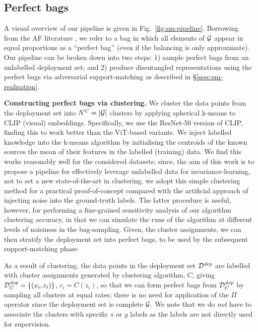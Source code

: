 %
\subsection{Perfect bags}\label{sec:sm-implementation}
%
A visual overview of our pipeline is given in Fig.~\ref{fig:sm-pipeline}. 
%
Borrowing from the \ac{AF} literature \citep{chouldechova17,KleMulRag16}, we refer to a bag in
which all elements of ${\mathcal{G}}$ appear in equal proportions as a ``perfect bag'' (even if the balancing
is only approximate). 
%
Our pipeline can be broken down into two steps: 1) sample perfect bags from an unlabelled
deployment set; and 2) produce disentangled representations using the perfect bags via adversarial
support-matching as described in \S\ref{ssec:sm-realisation}.

\textbf{Constructing perfect bags via clustering.}
%
We cluster the data points from the deployment set into \( N^C=|{\mathcal{G}}| \) clusters by applying
spherical k-means to CLIP \cite{radford2021learning} (visual) embeddings. 
%
Specifically, we use the ResNet-50 version of CLIP, finding this to work better than the ViT-based
variants. 
%
We inject labelled knowledge into the k-means algorithm by initialising the centroids of the known
sources the mean of their features in the labelled (training) data. 
%
We find this works reasonably well for the considered datasets; since, the aim of this work is to
propose a pipeline for effectively leverage unlabelled data for invariance-learning, not to set a
new state-of-the-art in clustering, we adopt this simple clustering method for a practical
proof-of-concept compared with the artificial approach of injecting noise into the ground-truth
labels. 
%
The latter procedure is useful, however, for performing a fine-grained sensitivity analysis of our
algorithm \wrt{} clustering accuracy, in that we can simulate the runs of the algorithm at
different levels of noisiness in the bag-sampling. 
%
%
Given, the cluster assignments, we can then stratify the deployment set into perfect bags, to be
used by the subsequent support-matching phase.

As a result of clustering, the data points in the deployment set \( {\mathcal{D}}^\mathit{dep} \) are
labelled with cluster assignments generated by clustering algorithm, \( C \), giving \(
{\mathcal{D}}^\mathit{dep}_C=\{(x_i, c_i)\} \), \(c_i = C(z_i) \),
%
so that we can form perfect bags from \( {\mathcal{D}}^\mathit{dep}_C \) by sampling all clusters at equal
rates; there is no need for application of the $\Pi$ operator since the deployment set is complete
\wrt{} ${\mathcal{G}}$.
%
We note that we do \emph{not} have to associate the clusters with specific $s$ or $y$ labels as the
labels are not directly used for supervision.

